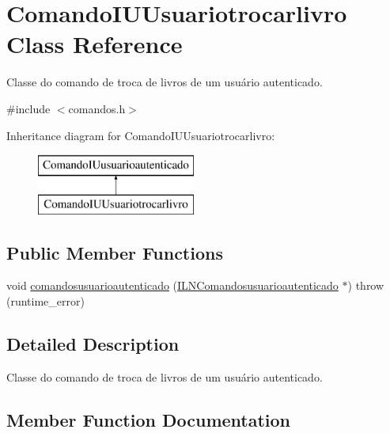 \hypertarget{classComandoIUUsuariotrocarlivro}{}\section{Comando\+I\+U\+Usuariotrocarlivro Class Reference}
\label{classComandoIUUsuariotrocarlivro}


Classe do comando de troca de livros de um usuário autenticado.  




{\ttfamily \#include $<$comandos.\+h$>$}

Inheritance diagram for Comando\+I\+U\+Usuariotrocarlivro\+:\begin{figure}[H]
\begin{center}
\leavevmode
\includegraphics[height=2.000000cm]{classComandoIUUsuariotrocarlivro}
\end{center}
\end{figure}
\subsection*{Public Member Functions}
\begin{DoxyCompactItemize}
\item 
void \hyperlink{classComandoIUUsuariotrocarlivro_acc17db322d213c4bb8780e7896a466d7}{comandosusuarioautenticado} (\hyperlink{classILNComandosusuarioautenticado}{I\+L\+N\+Comandosusuarioautenticado} $\ast$)  throw (runtime\+\_\+error)
\end{DoxyCompactItemize}


\subsection{Detailed Description}
Classe do comando de troca de livros de um usuário autenticado. 

\subsection{Member Function Documentation}
\mbox{\label{classComandoIUUsuariotrocarlivro_acc17db322d213c4bb8780e7896a466d7}} 
